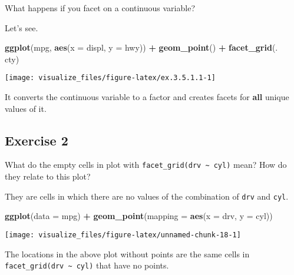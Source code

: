 \documentclass[]{book}
\newenvironment{Shaded}{\begin{snugshade}}{\end{snugshade}}
\newcommand{\DataTypeTok}[1]{\textcolor[rgb]{0.13,0.29,0.53}{#1}}
\newcommand{\KeywordTok}[1]{\textcolor[rgb]{0.13,0.29,0.53}{\textbf{#1}}}
\newcommand{\NormalTok}[1]{#1}
\newcommand{\OperatorTok}[1]{\textcolor[rgb]{0.81,0.36,0.00}{\textbf{#1}}}
\newcommand{\StringTok}[1]{\textcolor[rgb]{0.31,0.60,0.02}{#1}}
\theoremstyle{plain}
\theoremstyle{remark}
\theoremstyle{definition}
\theoremstyle{definition}
\theoremstyle{definition}
\theoremstyle{remark}
\begin{document}
What happens if you facet on a continuous variable?

Let's see.

\begin{Shaded}
\begin{Highlighting}[]
\KeywordTok{ggplot}\NormalTok{(mpg, }\KeywordTok{aes}\NormalTok{(}\DataTypeTok{x =}\NormalTok{ displ, }\DataTypeTok{y =}\NormalTok{ hwy)) }\OperatorTok{+}
\StringTok{  }\KeywordTok{geom_point}\NormalTok{() }\OperatorTok{+}
\StringTok{  }\KeywordTok{facet_grid}\NormalTok{(. }\OperatorTok{~}\StringTok{ }\NormalTok{cty)}
\end{Highlighting}
\end{Shaded}

\begin{center}\texttt{[image: visualize\_files/figure-latex/ex.3.5.1.1-1]} \end{center}

It converts the continuous variable to a factor and creates facets for
\textbf{all} unique values of it.

\hypertarget{exercise-2-1}{%
\subsection{Exercise 2}\label{exercise-2-1}}

What do the empty cells in plot with
\texttt{facet\_grid(drv\ \textasciitilde{}\ cyl)} mean? How do they
relate to this plot?

They are cells in which there are no values of the combination of
\texttt{drv} and \texttt{cyl}.

\begin{Shaded}
\begin{Highlighting}[]
\KeywordTok{ggplot}\NormalTok{(}\DataTypeTok{data =}\NormalTok{ mpg) }\OperatorTok{+}
\StringTok{  }\KeywordTok{geom_point}\NormalTok{(}\DataTypeTok{mapping =} \KeywordTok{aes}\NormalTok{(}\DataTypeTok{x =}\NormalTok{ drv, }\DataTypeTok{y =}\NormalTok{ cyl))}
\end{Highlighting}
\end{Shaded}

\begin{center}\texttt{[image: visualize\_files/figure-latex/unnamed-chunk-18-1]} \end{center}

The locations in the above plot without points are the same cells in
\texttt{facet\_grid(drv\ \textasciitilde{}\ cyl)} that have no points.
\end{document}
